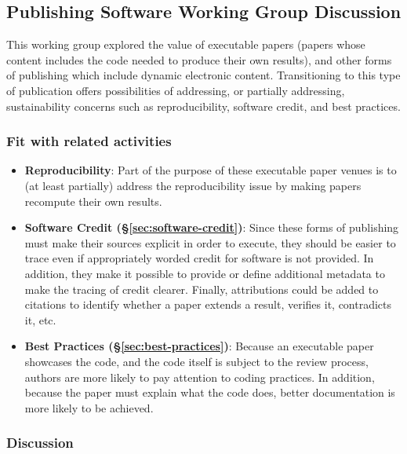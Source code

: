 \subsection{Publishing Software Working Group Discussion} \label{sec:publishing-software}

This working group explored the value of executable papers (papers whose content
includes the code needed to produce their own results), and other forms of
publishing which include dynamic electronic content.
%
%
Transitioning to this type of publication offers possibilities of addressing, or
partially addressing, sustainability concerns such as reproducibility, software
credit, and best practices.

\subsubsection{Fit with related activities}

\begin{itemize}
\item \textbf{Reproducibility}: Part of the purpose of these executable paper venues
is to (at least partially) address the reproducibility issue by making papers
recompute their own results.

\item\textbf{Software Credit (\S\ref{sec:software-credit})}: Since these forms of
publishing must make their sources explicit in order to execute, they should be
easier to trace even if appropriately worded credit for software is not
provided. In addition, they
make it possible to provide or define
additional metadata to make the tracing of credit clearer. Finally, attributions
could be added to citations to identify whether a paper extends a result,
verifies it, contradicts it, etc.

\item \textbf{Best Practices (\S\ref{sec:best-practices})}: Because an executable
paper showcases the code, and the code itself is subject to the review process,
authors are more likely to pay attention to coding practices. In addition,
because the paper must explain what the code does, better documentation is
more likely to be achieved.
\end{itemize}

\subsubsection{Discussion}

